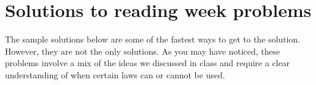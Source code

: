 \documentclass[../main.tex]{subfiles}
\begin{document}
 \section{Solutions to reading week problems}

The sample solutions below are some of the fastest ways to get to the solution. However, they are not the only solutions. As you may have noticed, these problems involve a mix of the ideas we discussed in class and require a clear understanding of when certain laws can or cannot be used.

\printsolutions[itemsep={1cm}] \label{page:midterm-prep-solutions}
\end{document}

